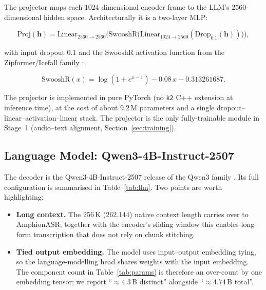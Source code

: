 The projector maps each $1024$-dimensional encoder frame to the LLM's
$2560$-dimensional hidden space. Architecturally it is a two-layer MLP:

\begin{equation}
  \mathrm{Proj}(\mathbf{h}) = \mathrm{Linear}_{2560 \to 2560}\Big(
      \mathrm{SwooshR}\big( \mathrm{Linear}_{1024 \to 2560}(\mathrm{Drop}_{0.1}(\mathbf{h})) \big) \Big),
  \label{eq:projector}
\end{equation}

with input dropout $0.1$ and the SwooshR activation function from the
Zipformer/Icefall family \cite{yao2024zipformer}:

\begin{equation}
  \mathrm{SwooshR}(x) = \log(1 + e^{x-1}) - 0.08\,x - 0.313261687.
  \label{eq:swooshr}
\end{equation}

The projector is implemented in pure PyTorch (no \texttt{k2} C++
extension at inference time), at the cost of about $9.2$\,M
parameters and a single dropout--linear--activation--linear stack. The
projector is the only fully-trainable module in Stage~1 (audio--text
alignment, Section~\ref{sec:training}).

\subsection{Language Model: Qwen3-4B-Instruct-2507}
\label{subsec:llm}

The decoder is the Qwen3-4B-Instruct-2507 release of the Qwen3 family
\cite{qwen2025qwen3}. Its full configuration is summarised in
Table~\ref{tab:llm}. Two points are worth highlighting:

\begin{itemize}
  \item \textbf{Long context.} The 256\,K (262{,}144) native context
        length carries over to AmphionASR; together with the
        encoder's sliding window this enables long-form transcription
        that does not rely on chunk stitching.
  \item \textbf{Tied output embedding.} The model uses input--output
        embedding tying, so the language-modelling head shares weights
        with the input embedding. The component count in
        Table~\ref{tab:params} is therefore an over-count by one
        embedding tensor; we report ``$\approx\!4.3$\,B distinct''
        alongside ``$\approx\!4.74$\,B total''.
\end{itemize}

